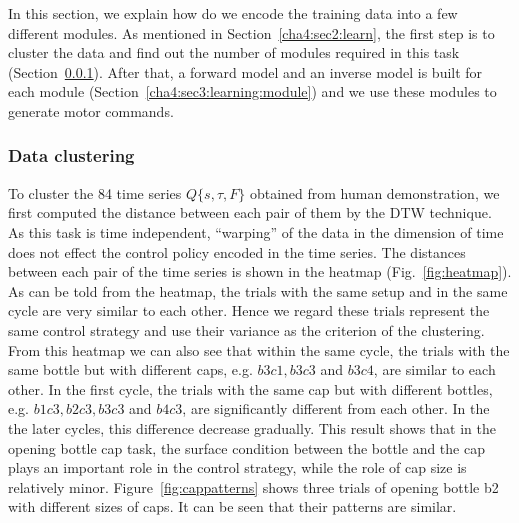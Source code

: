 In this section, we explain how do we encode the training data into a few different modules. As mentioned in Section~\ref{cha4:sec2:learn}, the first step is to cluster the data and find out the number of modules required in this task (Section~\ref{cha4:sec3:learning:clustering}). After that, a forward model and an inverse model is built for each module (Section~\ref{cha4:sec3:learning:module}) and we use these modules to generate motor commands.

\subsubsection{Data clustering}
\label{cha4:sec3:learning:clustering}
To cluster the 84 time series $Q\{s,\tau,F\}$ obtained from human demonstration, we first computed the distance between each pair of them by the DTW technique. As this task is time independent, ``warping'' of the data in the dimension of time does not effect the control policy encoded in the time series. The distances between each pair of the time series is shown in the heatmap (Fig.~\ref{fig:heatmap}). As can be told from the heatmap, the trials with the same setup and in the same cycle are very similar to each other. Hence we regard these trials represent the same control strategy and use their variance as the criterion of the clustering. From this heatmap we can also see that within the same cycle, the trials with the same bottle but with different caps, e.g. $b3c1, b3c3$ and $b3c4$, are similar to each other. In the first cycle, the trials with the same cap but with different bottles, e.g. $b1c3, b2c3, b3c3$ and $b4c3$, are significantly different from each other. In the the later cycles, this difference decrease gradually. This result shows that in the opening bottle cap task, the surface condition between the bottle and the cap plays an important role in the control strategy, while the role of cap size is relatively minor. Figure~\ref{fig:cappatterns} shows three trials of opening bottle b2 with different sizes of caps. It can be seen that their patterns are similar.

